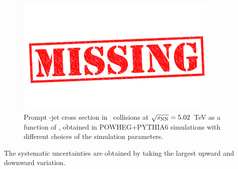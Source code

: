 \begin{figure}[bth]
\begin{center}
\includegraphics[width=.2\textwidth]{missing}
\caption{Prompt \Dstar-jet cross section in \pPb\ collisions at $\sqrt{s_{\rm NN}}=5.02$~TeV as a function of \ptchjet, obtained in POWHEG+PYTHIA6 simulations
with different choices of the simulation parameters.} 
\label{fig:PromptDJetsPrediction_JetPtSpectrum_DPt_30_GeneratorLevel_JetPtSpectrum}
\end{center}
\end{figure}

The systematic uncertainties are obtained by taking the largest upward and downward variation.

